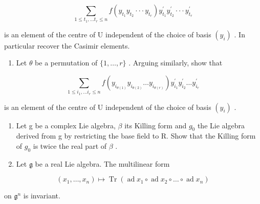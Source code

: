 \[
\sum_ {1 \leqslant t _ {1}, \dots t _ {r} \leqslant n} f (y _ {t _ {1}} y _ {t _ {2}} \cdot \cdot \cdot y _ {t _ {r}}) y _ {t _ {1}} ^ {\prime} y _ {t _ {2}} ^ {\prime} \cdot \cdot \cdot y _ {t _ {r}} ^ {\prime}
\]

is an element of the centre of U independent of the choice of basis \((y_{i})\) . In particular recover the Casimir elements.

\begin{enumerate}
\def\labelenumi{(\alph{enumi})}
\setcounter{enumi}{4}
\tightlist
\item
  Let \(\theta\) be a permutation of \(\{1, \ldots, r\}\) . Arguing similarly, show that
\end{enumerate}

\[
\sum_ {1 \leqslant i _ {1}, \dots i _ {r} \leqslant n} f (y _ {i _ {\theta (1)}} y _ {i _ {\theta (2)}} \dots y _ {i _ {\theta (r)}}) y _ {i _ {1}} ^ {\prime} y _ {i _ {2}} ^ {\prime} \dots y _ {i _ {r}} ^ {\prime}
\]

is an element of the centre of U independent of the choice of basis \((y_{i})\) .

\begin{enumerate}
\def\labelenumi{\arabic{enumi}.}
\setcounter{enumi}{6}
\item
  Let g be a complex Lie algebra, \(\beta\) its Killing form and \(g_{0}\) the Lie algebra derived from g by restricting the base field to R. Show that the Killing form of \(g_{0}\) is twice the real part of \(\beta\) .
\item
  Let \(\mathfrak{g}\) be a real Lie algebra. The multilinear form
\end{enumerate}

\[
(x _ {1}, \dots , x _ {n}) \mapsto \operatorname{Tr} (\operatorname{ad} x _ {1} \circ \operatorname{ad} x _ {2} \circ \dots \circ \operatorname{ad} x _ {n})
\]

on \(\mathfrak{g}^n\) is invariant.

